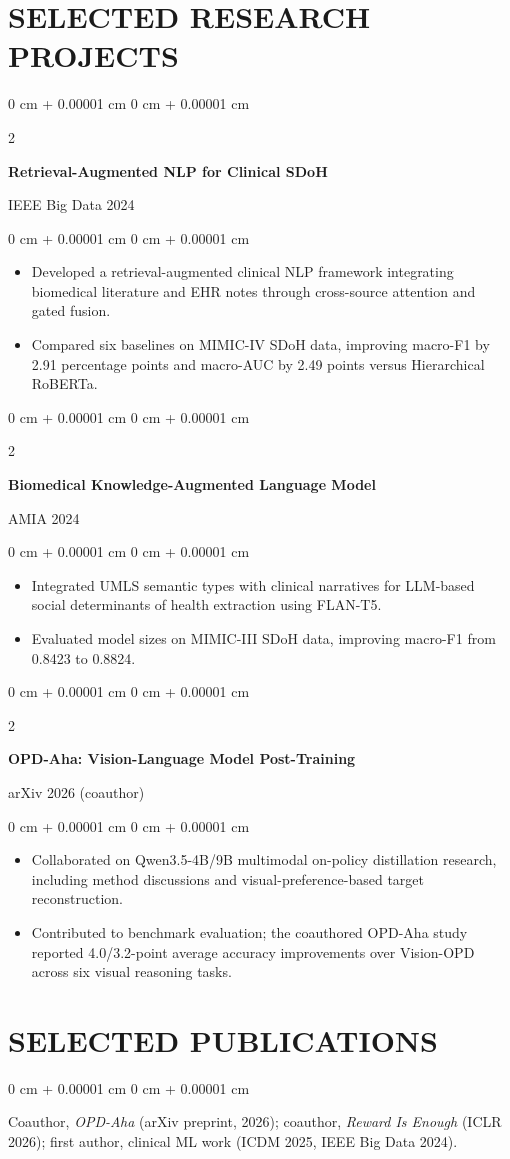\documentclass[10pt, letterpaper]{article}
\newenvironment{highlights}{
    \begin{itemize}[
        topsep=0.03 cm,
        parsep=0.03 cm,
        partopsep=0pt,
        itemsep=0pt,
        leftmargin=0 cm + 10pt
    ]
}{
    \end{itemize}
} %
\newenvironment{onecolentry}{
    \begin{adjustwidth}{
        0 cm + 0.00001 cm
    }{
        0 cm + 0.00001 cm
    }
}{
    \end{adjustwidth}
} %
\newenvironment{twocolentry}[2][]{
    \onecolentry
    \def\secondColumn{#2}
    \setcolumnwidth{\fill, 4.5 cm}
    \begin{paracol}{2}
}{
    \switchcolumn \raggedleft \secondColumn
    \end{paracol}
    \endonecolentry
} %
\begin{document}
\section{SELECTED RESEARCH PROJECTS}
\begin{twocolentry}{IEEE Big Data 2024}
\textbf{Retrieval-Augmented NLP for Clinical SDoH}
\end{twocolentry}
\begin{onecolentry}
\begin{highlights}
\item Developed a retrieval-augmented clinical NLP framework integrating biomedical literature and EHR notes through cross-source attention and gated fusion.
\item Compared six baselines on MIMIC-IV SDoH data, improving macro-F1 by 2.91 percentage points and macro-AUC by 2.49 points versus Hierarchical RoBERTa.
\end{highlights}
\end{onecolentry}
\vspace{0.03 cm}
\begin{twocolentry}{AMIA 2024}
\textbf{Biomedical Knowledge-Augmented Language Model}
\end{twocolentry}
\begin{onecolentry}
\begin{highlights}
\item Integrated UMLS semantic types with clinical narratives for LLM-based social determinants of health extraction using FLAN-T5.
\item Evaluated model sizes on MIMIC-III SDoH data, improving macro-F1 from 0.8423 to 0.8824.
\end{highlights}
\end{onecolentry}
\vspace{0.03 cm}
\begin{twocolentry}{arXiv 2026 (coauthor)}
\textbf{OPD-Aha: Vision-Language Model Post-Training}
\end{twocolentry}
\begin{onecolentry}
\begin{highlights}
\item Collaborated on Qwen3.5-4B/9B multimodal on-policy distillation research, including method discussions and visual-preference-based target reconstruction.
\item Contributed to benchmark evaluation; the coauthored OPD-Aha study reported 4.0/3.2-point average accuracy improvements over Vision-OPD across six visual reasoning tasks.
\end{highlights}
\end{onecolentry}
\vspace{0.03 cm}
\section{SELECTED PUBLICATIONS}
\begin{onecolentry}
Coauthor, \textit{OPD-Aha} (arXiv preprint, 2026); coauthor, \textit{Reward Is Enough} (ICLR 2026); first author, clinical ML work (ICDM 2025, IEEE Big Data 2024).
\end{onecolentry}
\end{document}

